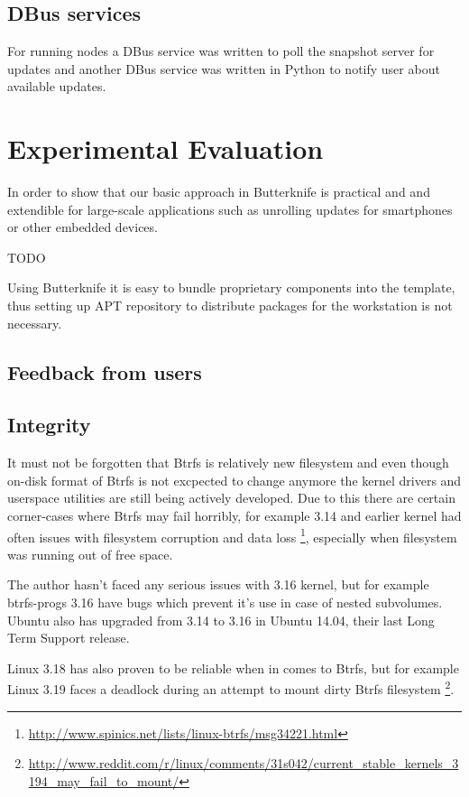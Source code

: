 \documentclass[a4paper,11pt]{kth-mag}
\begin{document}
\section{DBus services}

For running nodes a DBus service was written to poll the snapshot server
for updates and another DBus service was written in Python to notify user
about available updates.



%
%
%
%
\chapter{Experimental Evaluation}
\label{chap:eval}
In order to show that our basic approach in Butterknife is practical and
and extendible for large-scale applications such as unrolling
updates for smartphones or other embedded devices.

TODO

Using Butterknife it is easy to bundle proprietary components
into the template, thus setting up APT repository to distribute
packages for the workstation is not necessary.

\clearpage

\section{Feedback from users}

\section{Integrity}

It must not be forgotten that Btrfs is relatively 
new filesystem and even though on-disk format of
Btrfs is not excpected to change anymore
the kernel drivers and userspace utilities are
still being actively developed.
Due to this there are certain corner-cases where
Btrfs may fail horribly,
for example 3.14 and earlier kernel had often issues
with filesystem corruption and data loss
\footnote{\url{http://www.spinics.net/lists/linux-btrfs/msg34221.html}},
especially when filesystem was running out of free space.

The author hasn't faced any serious issues with
3.16 kernel, but for example btrfs-progs 3.16 have
bugs which prevent it's use in case of nested subvolumes.
Ubuntu also has upgraded from 3.14 to 3.16 in Ubuntu 14.04,
their last Long Term Support release.

Linux 3.18 has also proven to be reliable when in comes
to Btrfs, but for example Linux 3.19 faces
a deadlock during an attempt to mount
dirty Btrfs filesystem
\footnote{\url{http://www.reddit.com/r/linux/comments/31s042/current_stable_kernels_3194_may_fail_to_mount/}}.
\end{document}
